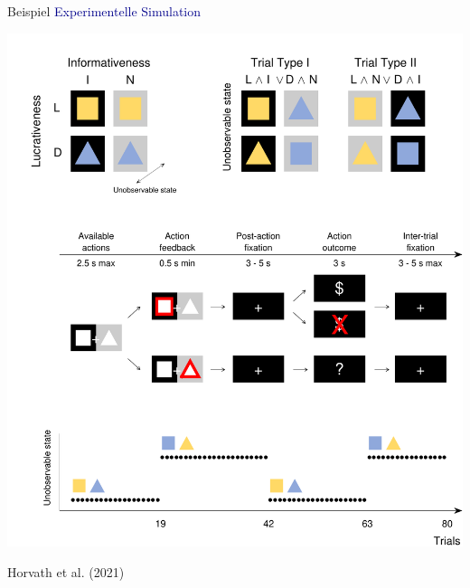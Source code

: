 \documentclass[
  8pt,
  ignorenonframetext,
]{beamer}
\begin{document}
\begin{frame}{Beispiel}
\protect\hypertarget{beispiel-1}{}
\textcolor{darkblue}{Experimentelle Simulation} \vspace{-2mm}

\begin{center}\includegraphics[width=0.55\linewidth]{2_Abbildungen/pfm_2_horvath_experimentelle_simulation} \end{center}

\flushright
\footnotesize

Horvath et al. (2021)
\end{frame}
\end{document}

